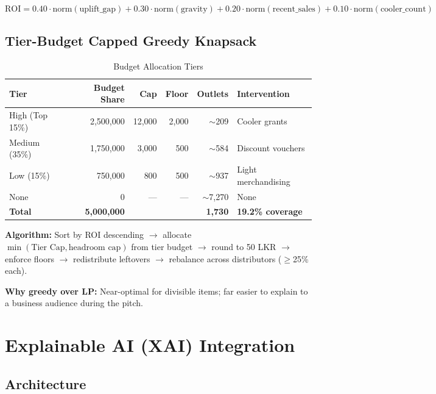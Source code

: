 \documentclass[10.75pt, a4paper]{article}
\begin{document}
\begin{equation}
\text{ROI} = 0.40 \cdot \text{norm}(\text{uplift\_gap}) + 0.30 \cdot \text{norm}(\text{gravity}) + 0.20 \cdot \text{norm}(\text{recent\_sales}) + 0.10 \cdot \text{norm}(\text{cooler\_count})
\end{equation}

\subsection{Tier-Budget Capped Greedy Knapsack}

\begin{table}[H]
\centering
\caption{Budget Allocation Tiers}
\begin{tabular}{lrrrrl}
\toprule
\textbf{Tier} & \textbf{Budget Share} & \textbf{Cap} & \textbf{Floor} & \textbf{Outlets} & \textbf{Intervention} \\
\midrule
High (Top 15\%) & 2,500,000 & 12,000 & 2,000 & $\sim$209 & Cooler grants \\
Medium (35\%) & 1,750,000 & 3,000 & 500 & $\sim$584 & Discount vouchers \\
Low (15\%) & 750,000 & 800 & 500 & $\sim$937 & Light merchandising \\
None & 0 & --- & --- & $\sim$7,270 & None \\
\midrule
\textbf{Total} & \textbf{5,000,000} & & & \textbf{1,730} & \textbf{19.2\% coverage} \\
\bottomrule
\end{tabular}
\end{table}

\textbf{Algorithm:} Sort by ROI descending $\rightarrow$ allocate $\min(\text{Tier Cap}, \text{headroom cap})$ from tier budget $\rightarrow$ round to 50 LKR $\rightarrow$ enforce floors $\rightarrow$ redistribute leftovers $\rightarrow$ rebalance across distributors ($\geq$25\% each).

\textbf{Why greedy over LP:} Near-optimal for divisible items; far easier to explain to a business audience during the pitch.

\section{Explainable AI (XAI) Integration}

\subsection{Architecture}
\end{document}
